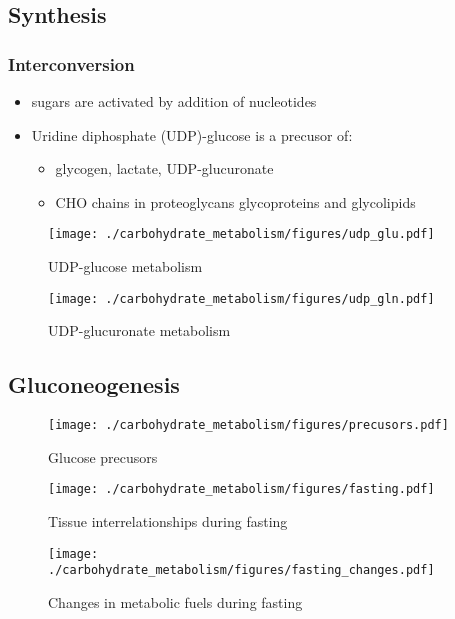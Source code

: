\documentclass{scrartcl}
\begin{document}
\subsection{Synthesis}
\label{sec:orgbc28eec}
\subsubsection{Interconversion}
\label{sec:orgd96f274}
\begin{itemize}
\item sugars are activated by addition of nucleotides
\item Uridine diphosphate (UDP)-glucose is a precusor of:
\begin{itemize}
\item glycogen, lactate, UDP-glucuronate
\item CHO chains in proteoglycans glycoproteins and glycolipids
\end{itemize}
\end{itemize}

\begin{figure}[htbp]
\centering
\texttt{[image: ./carbohydrate\_metabolism/figures/udp\_glu.pdf]}
\caption{\label{fig:org3ec6b7b}
UDP-glucose metabolism}
\end{figure}

\begin{figure}[htbp]
\centering
\texttt{[image: ./carbohydrate\_metabolism/figures/udp\_gln.pdf]}
\caption{\label{fig:org3a60a50}
UDP-glucuronate metabolism}
\end{figure}

\subsection{Gluconeogenesis}
\label{sec:org1caa32c}

\begin{figure}[htbp]
\centering
\texttt{[image: ./carbohydrate\_metabolism/figures/precusors.pdf]}
\caption{\label{fig:org4b43f2f}
Glucose precusors}
\end{figure}


\begin{figure}[htbp]
\centering
\texttt{[image: ./carbohydrate\_metabolism/figures/fasting.pdf]}
\caption{\label{fig:org9b99b5c}
Tissue interrelationships during fasting}
\end{figure}


\begin{figure}[htbp]
\centering
\texttt{[image: ./carbohydrate\_metabolism/figures/fasting\_changes.pdf]}
\caption{\label{fig:org04ecc0c}
Changes in metabolic fuels during fasting}
\end{figure}
\end{document}
